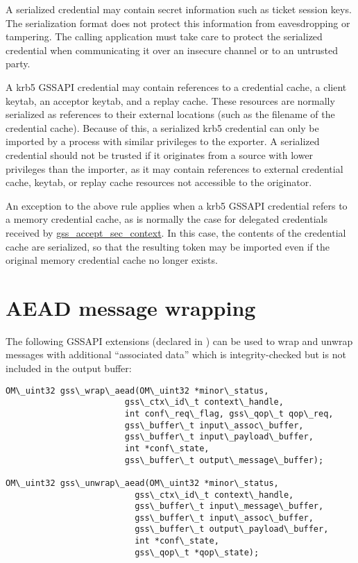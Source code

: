 \documentclass[letterpaper,10pt,english]{sphinxmanual}
\begin{document}
A serialized credential may contain secret information such as ticket
session keys.  The serialization format does not protect this
information from eavesdropping or tampering.  The calling application
must take care to protect the serialized credential when communicating
it over an insecure channel or to an untrusted party.

A krb5 GSSAPI credential may contain references to a credential cache,
a client keytab, an acceptor keytab, and a replay cache.  These
resources are normally serialized as references to their external
locations (such as the filename of the credential cache).  Because of
this, a serialized krb5 credential can only be imported by a process
with similar privileges to the exporter.  A serialized credential
should not be trusted if it originates from a source with lower
privileges than the importer, as it may contain references to external
credential cache, keytab, or replay cache resources not accessible to
the originator.

An exception to the above rule applies when a krb5 GSSAPI credential
refers to a memory credential cache, as is normally the case for
delegated credentials received by \href{http://tools.ietf.org/html/rfc2744.html\#section-5.1}{gss\_accept\_sec\_context}.  In this
case, the contents of the credential cache are serialized, so that the
resulting token may be imported even if the original memory credential
cache no longer exists.


\section{AEAD message wrapping}
\label{appdev/gssapi:aead-message-wrapping}
The following GSSAPI extensions (declared in
) can be used to wrap and unwrap messages
with additional ``associated data'' which is integrity-checked but is
not included in the output buffer:

\begin{Verbatim}[commandchars=\\\{\}]
OM\_uint32 gss\_wrap\_aead(OM\_uint32 *minor\_status,
                        gss\_ctx\_id\_t context\_handle,
                        int conf\_req\_flag, gss\_qop\_t qop\_req,
                        gss\_buffer\_t input\_assoc\_buffer,
                        gss\_buffer\_t input\_payload\_buffer,
                        int *conf\_state,
                        gss\_buffer\_t output\_message\_buffer);

OM\_uint32 gss\_unwrap\_aead(OM\_uint32 *minor\_status,
                          gss\_ctx\_id\_t context\_handle,
                          gss\_buffer\_t input\_message\_buffer,
                          gss\_buffer\_t input\_assoc\_buffer,
                          gss\_buffer\_t output\_payload\_buffer,
                          int *conf\_state,
                          gss\_qop\_t *qop\_state);
\end{Verbatim}
\end{document}
